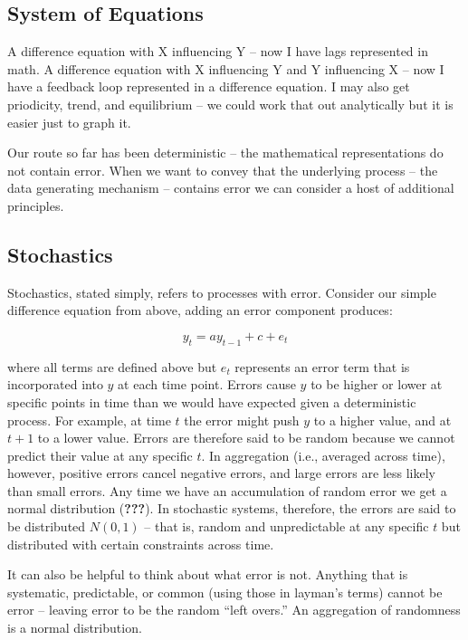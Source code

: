 \documentclass[english,,man]{apa6}
\theoremstyle{definition}
\theoremstyle{definition}
\theoremstyle{definition}
\theoremstyle{remark}
\begin{document}
\hypertarget{system-of-equations}{%
\subsection{System of Equations}\label{system-of-equations}}

A difference equation with X influencing Y -- now I have lags
represented in math. A difference equation with X influencing Y and Y
influencing X -- now I have a feedback loop represented in a difference
equation. I may also get priodicity, trend, and equilibrium -- we could
work that out analytically but it is easier just to graph it.

Our route so far has been deterministic -- the mathematical
representations do not contain error. When we want to convey that the
underlying process -- the data generating mechanism -- contains error we
can consider a host of additional principles.

\hypertarget{stochastics}{%
\subsection{Stochastics}\label{stochastics}}

Stochastics, stated simply, refers to processes with error. Consider our
simple difference equation from above, adding an error component
produces:

\begin{equation}
\label{diffE}
y_{t} = a y_{t-1} + c + e_{t}
\end{equation}

\noindent where all terms are defined above but \(e_{t}\) represents an
error term that is incorporated into \(y\) at each time point. Errors
cause \(y\) to be higher or lower at specific points in time than we
would have expected given a deterministic process. For example, at time
\(t\) the error might push \(y\) to a higher value, and at \(t+1\) to a
lower value. Errors are therefore said to be random because we cannot
predict their value at any specific \(t\). In aggregation (i.e.,
averaged across time), however, positive errors cancel negative errors,
and large errors are less likely than small errors. Any time we have an
accumulation of random error we get a normal distribution
({\textbf{???}}). In stochastic systems, therefore, the errors are said
to be distributed \(N(0, 1)\) -- that is, random and unpredictable at
any specific \(t\) but distributed with certain constraints across time.

It can also be helpful to think about what error is not. Anything that
is systematic, predictable, or common (using those in layman's terms)
cannot be error -- leaving error to be the random \enquote{left overs.}
An aggregation of randomness is a normal distribution.
\end{document}
